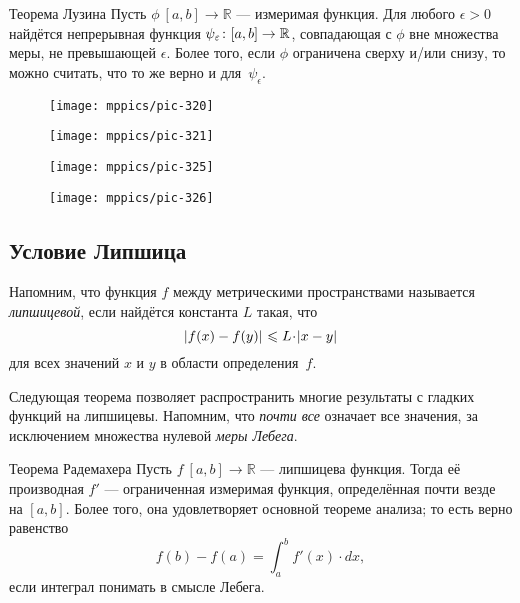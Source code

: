 \begin{multicols}{2}
{\begin{thm}{Теорема Лузина}\label{thm:lusin}
Пусть $\phi\:[a,b]\to \mathbb{R}$ --- измеримая функция.
Для любого $\epsilon>0$ найдётся непрерывная функция $\psi_\epsilon\:[a,b]\z\to \mathbb{R}$, совпадающая с $\phi$ вне множества меры, не превышающей $\epsilon$.
Более того, если $\phi$ ограничена сверху и/или снизу, то можно считать, что то же верно и для~$\psi_\epsilon$.  
\end{thm}

\begin{figure*}[b!]
\begin{minipage}{.48\textwidth}
\centering
\texttt{[image: mppics/pic-320]}
\end{minipage}\hfill
\begin{minipage}{.48\textwidth}
\centering
\texttt{[image: mppics/pic-321]}
\end{minipage}
\end{figure*}

\begin{figure*}[t!]
\begin{minipage}{.48\textwidth}
\centering
\texttt{[image: mppics/pic-325]}
\end{minipage}\hfill
\begin{minipage}{.48\textwidth}
\centering
\texttt{[image: mppics/pic-326]}
\end{minipage}
\end{figure*}

\subsection*{Условие Липшица}

Напомним, что функция $f$ между метрическими пространствами называется \emph{липшицевой}, если найдётся константа $L$ такая, что 
\[\dist{f(x)}{f(y)}{}\le L\cdot\dist{x}{y}{}\]
для всех значений $x$ и $y$ в области определения~$f$.

Следующая теорема позволяет распространить многие результаты с гладких функций на липшицевы.
Напомним, что {}\emph{почти все} означает все значения, за исключением множества нулевой {}\emph{меры Лебега}.

\begin{thm}{Теорема Радемахера}\label{thm:rademacher}
Пусть $f\:[a,b]\to\mathbb{R}$ --- липшицева функция.
Тогда её производная $f'$ --- ограниченная измеримая функция, определённая почти везде на $[a,b]$.
Более того, она удовлетворяет основной теореме анализа; то есть верно равенство 
\[f(b)-f(a)=\int_a^b f'(x)\cdot dx,\]
если интеграл понимать в смысле Лебега.
\end{thm}


}
\end{multicols}
